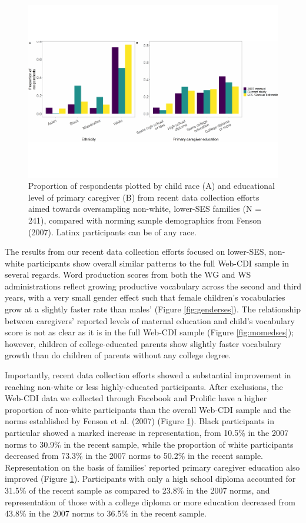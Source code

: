 \documentclass[
  english,
  man]{apa7}
\begin{document}
\begin{figure}
\centering
\includegraphics{webcdi_paper_files/figure-latex/demobarses-1.pdf}
\caption{\label{fig:demobarses}Proportion of respondents plotted by child race (A) and educational level of primary caregiver (B) from recent data collection efforts aimed towards oversampling non-white, lower-SES families (N = 241), compared with norming sample demographics from Fenson (2007). Latinx participants can be of any race.}
\end{figure}

The results from our recent data collection efforts focused on lower-SES, non-white participants show overall similar patterns to the full Web-CDI sample in several regards. Word production scores from both the WG and WS administrations reflect growing productive vocabulary across the second and third years, with a very small gender effect such that female children's vocabularies grow at a slightly faster rate than males' (Figure \ref{fig:genderses}). The relationship between caregivers' reported levels of maternal education and child's vocabulary score is not as clear as it is in the full Web-CDI sample (Figure \ref{fig:momedses}); however, children of college-educated parents show slightly faster vocabulary growth than do children of parents without any college degree.

Importantly, recent data collection efforts showed a substantial improvement in reaching non-white or less highly-educated participants. After exclusions, the Web-CDI data we collected through Facebook and Prolific have a higher proportion of non-white participants than the overall Web-CDI sample and the norms established by Fenson et al. (2007) (Figure \ref{fig:demobarses}). Black participants in particular showed a marked increase in representation, from 10.5\% in the 2007 norms to 30.9\% in the recent sample, while the proportion of white participants decreased from 73.3\% in the 2007 norms to 50.2\% in the recent sample. Representation on the basis of families' reported primary caregiver education also improved (Figure \ref{fig:demobarses}). Participants with only a high school diploma accounted for 31.5\% of the recent sample as compared to 23.8\% in the 2007 norms, and representation of those with a college diploma or more education decreased from 43.8\% in the 2007 norms to 36.5\% in the recent sample.
\end{document}
